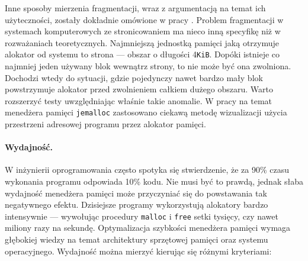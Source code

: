 \documentclass[12pt,a4paper,titlepage,twoside]{mwart}
\begin{document}
Inne sposoby mierzenia fragmentacji, wraz z argumentacją na temat ich
użyteczności, zostały dokładnie omówione w pracy \cite{johnstone98memory}.
Problem fragmentacji w systemach komputerowych ze stronicowaniem ma nieco inną
specyfikę niż w rozważaniach teoretycznych. Najmniejszą jednostką pamięci jaką
otrzymuje alokator od systemu to strona --- obszar o długości 4\texttt{KiB}.
Dopóki istnieje co najmniej jeden używany blok wewnątrz strony, to nie może być
ona zwolniona.  Dochodzi wtedy do sytuacji, gdzie pojedynczy nawet bardzo mały
blok powstrzymuje alokator przed zwolnieniem całkiem dużego obszaru. Warto
rozszerzyć testy uwzględniając właśnie takie anomalie. W pracy na temat
menedżera pamięci \texttt{jemalloc} \cite{evans06scalable} zastosowano ciekawą
metodę wizualizacji użycia przestrzeni adresowej programu przez alokator
pamięci.

\paragraph{Wydajność.} W inżynierii oprogramowania często spotyka się
stwierdzenie, że za 90\% czasu wykonania programu odpowiada 10\% kodu. Nie musi
być to prawdą, jednak słaba wydajność menedżera pamięci może przyczyniać się do
powstawania tak negatywnego efektu. Dzisiejsze programy wykorzystują alokatory
bardzo intensywnie --- wywołując procedury \texttt{malloc} i \texttt{free} setki
tysięcy, czy nawet miliony razy na sekundę. Optymalizacja szybkości menedżera
pamięci wymaga głębokiej wiedzy na temat architektury sprzętowej pamięci oraz
systemu operacyjnego. Wydajność można mierzyć kierując się różnymi kryteriami:
\end{document}
